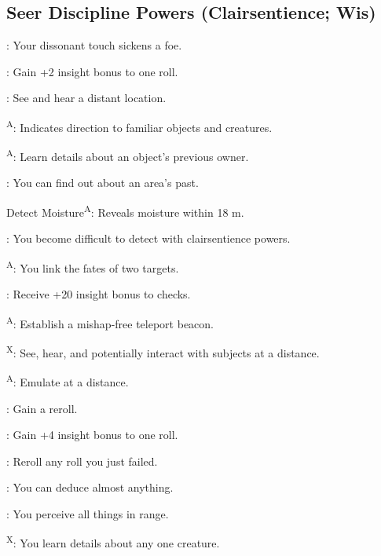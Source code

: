 \subsection{Seer Discipline Powers {\normalsize(Clairsentience; Wis)}}
\begin{enumerate*}
\item {}: Your dissonant touch sickens a foe.

: Gain +2 insight bonus to one roll.

\item {}: See and hear a distant location.

\textsuperscript{A}: Indicates direction to familiar objects and creatures. %

\textsuperscript{A}: Learn details about an object's previous owner.

: You can find out about an area's past.

\item Detect Moisture\textsuperscript{A}: Reveals moisture within 18 m. %

: You become difficult to detect with clairsentience powers.

\textsuperscript{A}: You link the fates of two targets.

: Receive +20 insight bonus to  checks. %

\item {}\textsuperscript{A}: Establish a mishap-free teleport beacon.

\textsuperscript{X}: See, hear, and potentially interact with 
subjects at a distance.
\item {}\textsuperscript{A}: Emulate  at a distance.

: Gain a reroll.

\item {}: Gain +4 insight bonus to one roll.
\item {}: Reroll any roll you just failed.
\item {}: You can deduce almost anything.
\item {}: You perceive all things in range. %

\textsuperscript{X}: You learn details about any one creature.
\end{enumerate*}



